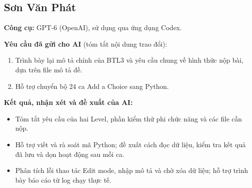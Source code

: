 \documentclass[12pt,a4paper]{article}
\begin{document}
\subsection{Sơn Văn Phát}
\textbf{Công cụ:} GPT-6 (OpenAI), sử dụng qua ứng dụng Codex.

\noindent\textbf{Yêu cầu đã gửi cho AI} (tóm tắt nội dung trao đổi):
\begin{enumerate}[noitemsep]
  \item Trình bày lại mô tả chính của BTL3 và yêu cầu chung về hình thức nộp bài, dựa trên file mô tả đề.
  \item Hỗ trợ chuyển bộ 24 ca Add a Choice sang Python.
\end{enumerate}

\noindent\textbf{Kết quả, nhận xét và đề xuất của AI:}
\begin{itemize}[noitemsep]
  \item Tóm tắt yêu cầu của hai Level, phần kiểm thử phi chức năng và các file cần nộp.
  \item Hỗ trợ viết và rà soát mã Python; đề xuất cách đọc dữ liệu, kiểm tra kết quả đã lưu và dọn hoạt động sau mỗi ca.
  \item Phân tích lỗi thao tác Edit mode, nhập mô tả và chờ xóa dữ liệu; hỗ trợ trình bày báo cáo từ log chạy thực tế.
\end{itemize}
\end{document}
